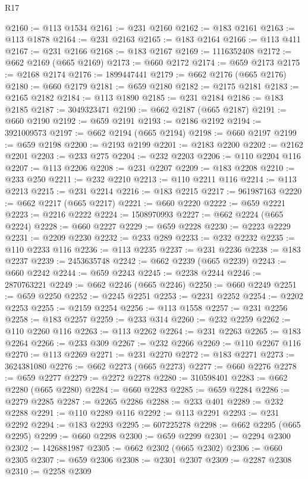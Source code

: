 \begin{lexlean}{R17}
\begin{coremodule}
@2160 := @113 @1534
@2161 := @231 @2160
@2162 := @183 @2161
@2163 := @113 @1878
@2164 := @231 @2163
@2165 := @183 @2164
@2166 := @113 @411
@2167 := @231 @2166
@2168 := @183 @2167
@2169 := 1116352408
@2172 := @662 @2169 (@665 @2169)
@2173 := @660 @2172
@2174 := @659 @2173
@2175 := @2168 @2174
@2176 := 1899447441
@2179 := @662 @2176 (@665 @2176)
@2180 := @660 @2179
@2181 := @659 @2180
@2182 := @2175 @2181
@2183 := @2165 @2182
@2184 := @113 @1890
@2185 := @231 @2184
@2186 := @183 @2185
@2187 := 3049323471
@2190 := @662 @2187 (@665 @2187)
@2191 := @660 @2190
@2192 := @659 @2191
@2193 := @2186 @2192
@2194 := 3921009573
@2197 := @662 @2194 (@665 @2194)
@2198 := @660 @2197
@2199 := @659 @2198
@2200 := @2193 @2199
@2201 := @2183 @2200
@2202 := @2162 @2201
@2203 := @233 @275
@2204 := @232 @2203
@2206 := @110 @2204 @116
@2207 := @113 @2206
@2208 := @231 @2207
@2209 := @183 @2208
@2210 := @233 @250
@2211 := @232 @2210
@2213 := @110 @2211 @116
@2214 := @113 @2213
@2215 := @231 @2214
@2216 := @183 @2215
@2217 := 961987163
@2220 := @662 @2217 (@665 @2217)
@2221 := @660 @2220
@2222 := @659 @2221
@2223 := @2216 @2222
@2224 := 1508970993
@2227 := @662 @2224 (@665 @2224)
@2228 := @660 @2227
@2229 := @659 @2228
@2230 := @2223 @2229
@2231 := @2209 @2230
@2232 := @233 @289
@2233 := @232 @2232
@2235 := @110 @2233 @116
@2236 := @113 @2235
@2237 := @231 @2236
@2238 := @183 @2237
@2239 := 2453635748
@2242 := @662 @2239 (@665 @2239)
@2243 := @660 @2242
@2244 := @659 @2243
@2245 := @2238 @2244
@2246 := 2870763221
@2249 := @662 @2246 (@665 @2246)
@2250 := @660 @2249
@2251 := @659 @2250
@2252 := @2245 @2251
@2253 := @2231 @2252
@2254 := @2202 @2253
@2255 := @2159 @2254
@2256 := @113 @1558
@2257 := @231 @2256
@2258 := @183 @2257
@2259 := @233 @314
@2260 := @232 @2259
@2262 := @110 @2260 @116
@2263 := @113 @2262
@2264 := @231 @2263
@2265 := @183 @2264
@2266 := @233 @309
@2267 := @232 @2266
@2269 := @110 @2267 @116
@2270 := @113 @2269
@2271 := @231 @2270
@2272 := @183 @2271
@2273 := 3624381080
@2276 := @662 @2273 (@665 @2273)
@2277 := @660 @2276
@2278 := @659 @2277
@2279 := @2272 @2278
@2280 := 310598401
@2283 := @662 @2280 (@665 @2280)
@2284 := @660 @2283
@2285 := @659 @2284
@2286 := @2279 @2285
@2287 := @2265 @2286
@2288 := @233 @401
@2289 := @232 @2288
@2291 := @110 @2289 @116
@2292 := @113 @2291
@2293 := @231 @2292
@2294 := @183 @2293
@2295 := 607225278
@2298 := @662 @2295 (@665 @2295)
@2299 := @660 @2298
@2300 := @659 @2299
@2301 := @2294 @2300
@2302 := 1426881987
@2305 := @662 @2302 (@665 @2302)
@2306 := @660 @2305
@2307 := @659 @2306
@2308 := @2301 @2307
@2309 := @2287 @2308
@2310 := @2258 @2309

\end{coremodule}
\end{lexlean}
